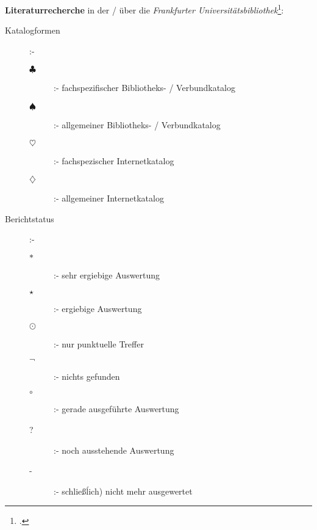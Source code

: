 \documentclass[
  DIV=calc,
  BCOR=5mm,
  11pt,
  headings=small,
  oneside,
  abstract=true,
  toc=bib,
  english,ngerman]{scrartcl}
\newcommand{\TopicalLibraryCatalog}{$\clubsuit$}
\newcommand{\TopicalLibraryCatalogDefinition}{fachspezifischer Bibliotheks- / Verbundkatalog}
\newcommand{\GeneralLibraryCatalog}{$\spadesuit$}
\newcommand{\GeneralLibraryCatalogDefinition}{allgemeiner Bibliotheks- / Verbundkatalog}
\newcommand{\TopicalInternetCatalog}{$\heartsuit$}
\newcommand{\TopicalInternetCatalogDefinition}{fachspezischer Internetkatalog}
\newcommand{\GeneralInternetCatalog}{$\diamondsuit$}
\newcommand{\GeneralInternetCatalogDefinition}{allgemeiner Internetkatalog}
\newcommand{\many}{$\ast$}
\newcommand{\manyDef}{sehr ergiebige Auswertung}
\newcommand{\some}{$\star$}
\newcommand{\someDef}{ergiebige Auswertung}
\newcommand{\few}{$\odot$}
\newcommand{\fewDef}{nur punktuelle Treffer}
\newcommand{\nothing}{$\neg$}
\newcommand{\nothingDef}{nichts gefunden}
\newcommand{\ongoing}{$\circ$}
\newcommand{\ongoingDef}{gerade ausgeführte Auswertung}
\newcommand{\open}{?}
\newcommand{\openDef}{noch ausstehende Auswertung}
\newcommand{\ignored}{-}
\newcommand{\ignoredDef}{schließĺich) nicht mehr ausgewertet}
\begin{document}
\textbf{Literaturrecherche} in der / über die 
\emph{Frankfurter Universitätsbibliothek}\footcite[s.][n.P.]{UbFam2018a}:


\begin{description}
  \item[Katalogformen] :-
    \begin{description}
      \item[\TopicalLibraryCatalog] :- \TopicalLibraryCatalogDefinition
      \item[\GeneralLibraryCatalog] :- \GeneralLibraryCatalogDefinition
      \item[\TopicalInternetCatalog] :- \TopicalInternetCatalogDefinition
      \item[\GeneralInternetCatalog] :- \GeneralInternetCatalogDefinition
    \end{description}
  \item[Berichtstatus] :-
    \begin{description}
      \item[\many] :- \manyDef
      \item[\some] :- \someDef
      \item[\few] :- \fewDef
      \item[\nothing] :- \nothingDef
      \item[\ongoing] :- \ongoingDef
      \item[\open] :- \openDef
      \item[\ignored] :- \ignoredDef
    \end{description}
\end{description}



\end{document}
